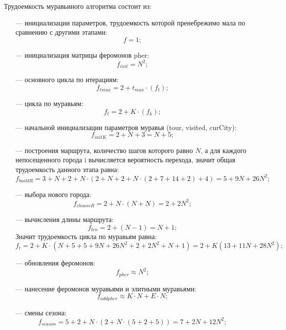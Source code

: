 Трудоемкость муравьиного алгоритма состоит из:
\begin{itemize}
    \item[---] инициализации параметров, трудоемкость которой пренебрежимо мала по сравнению с другими этапами:
    \begin{equation}
        f = 1;
    \end{equation}
	\item[---] инициализация матрицы феромонов pher:
	\begin{equation}
		f_{init} = N^2;
	\end{equation}
	\item[---] основного цикла по итерациям:
	\begin{equation}
		f_{tmax} = 2 + t_{max} \cdot (f_{t});
	\end{equation}
	\item[---] цикла по муравьям:
	\begin{equation}
		f_{t} = 2 + K \cdot (f_{k});
	\end{equation}
    \item[---] начальной инициализации параметров муравья (tour, visited, curCity):
	\begin{equation}
		f_{initK} = 2 + N + 3=N+5;
	\end{equation}
    \item[---] построения маршрута, количество шагов которого равно $N$, а для каждого непосещенного города i вычисляется вероятность перехода, значит общая трудоемкость данного этапа равна:
	\begin{equation}
		f_{buildR} = 3 + N + 2 + N \cdot (2 + N + 2 + N \cdot (2 + 7 + 14 + 2) + 4) = 5 + 9N + 26N^2;
	\end{equation}
    \item[---] выбора нового города:
	\begin{equation}
		f_{chooseR} = 2 + N \cdot (N + N) = 2+2N^2;
	\end{equation}
    \item[---] вычисления длины маршрута:
	\begin{equation}
		f_{len} = 2 + (N - 1) = N + 1;
	\end{equation}
    Значит трудоемкость цикла по муравьям равна:
    \begin{equation}
		f_{t} = 2 + K \cdot (N+5+5 + 9N + 26N^2+2+2N^2+N + 1)=2+K(13+11N+28N^2);
	\end{equation}
    \item[---] обновления феромонов:
	\begin{equation}
		f_{pher} \approx N^2;
	\end{equation}
    \item[---] нанесение феромонов муравьями и элитными муравьями:
	\begin{equation}
		f_{addpher} \approx K\cdot N + E\cdot N;
	\end{equation}
    \item[---] смены сезона:
	\begin{equation}
		f_{season} = 5 + 2 + N\cdot(2 + N\cdot (5+2 + 5)) = 7+2N+12N^2;
	\end{equation}


\end{itemize}
